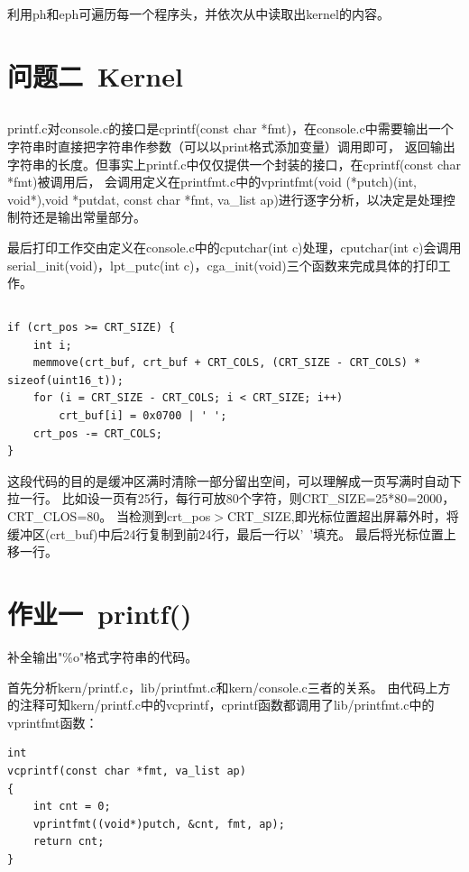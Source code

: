 \documentclass[12pt,a4paper,UTF8]{article}
\begin{document}
	利用ph和eph可遍历每一个程序头，并依次从中读取出kernel的内容。


\section{问题二\ Kernel}

	\subsection{}
	printf.c对console.c的接口是cprintf(const char *fmt)，在console.c中需要输出一个字符串时直接把字符串作参数（可以以print格式添加变量）调用即可，
	返回输出字符串的长度。但事实上printf.c中仅仅提供一个封装的接口，在cprintf(const char *fmt)被调用后，
	会调用定义在printfmt.c中的vprintfmt(void (*putch)(int, void*),void *putdat, const char *fmt, va\_list ap)进行逐字分析，以决定是处理控制符还是输出常量部分。

	最后打印工作交由定义在console.c中的cputchar(int c)处理，cputchar(int c)会调用serial\_init(void)，lpt\_putc(int c)，cga\_init(void)三个函数来完成具体的打印工作。

	\subsection{}
	\begin{lstlisting}[style=CPP]
if (crt_pos >= CRT_SIZE) {
	int i;
	memmove(crt_buf, crt_buf + CRT_COLS, (CRT_SIZE - CRT_COLS) * sizeof(uint16_t));
	for (i = CRT_SIZE - CRT_COLS; i < CRT_SIZE; i++)
		crt_buf[i] = 0x0700 | ' ';
	crt_pos -= CRT_COLS;
}
	\end{lstlisting}

	这段代码的目的是缓冲区满时清除一部分留出空间，可以理解成一页写满时自动下拉一行。
	比如设一页有25行，每行可放80个字符，则CRT\_SIZE=25*80=2000，CRT\_CLOS=80。
	当检测到crt\_pos$>$CRT\_SIZE,即光标位置超出屏幕外时，将缓冲区(crt\_buf)中后24行复制到前24行，最后一行以'\ '填充。
	最后将光标位置上移一行。

\section{作业一\ printf()}

补全输出"\%o"格式字符串的代码。

首先分析kern/printf.c，lib/printfmt.c和kern/console.c三者的关系。
由代码上方的注释可知kern/printf.c中的vcprintf，cprintf函数都调用了lib/printfmt.c中的vprintfmt函数：

\begin{lstlisting}[style=CPP]
int
vcprintf(const char *fmt, va_list ap)
{
	int cnt = 0;
	vprintfmt((void*)putch, &cnt, fmt, ap);
	return cnt;
}    
\end{lstlisting}
\end{document}
